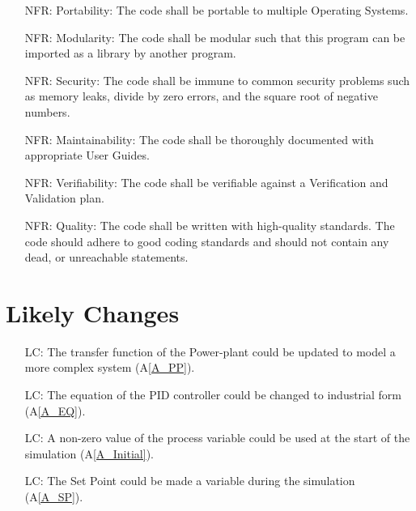 \documentclass[12pt]{article}
\newcommand{\aref}[1]{A\ref{#1}}
\newcounter{reqnum} %
\newcounter{nfreqnum} %
\newcounter{lcnum} %
\begin{document}
\noindent \begin{itemize}

\item[NFR\refstepcounter{nfreqnum}\thenfreqnum \label{R_Portability}:] Portability:
 The code shall be portable to multiple Operating Systems.

\item[NFR\refstepcounter{nfreqnum}\thenfreqnum \label{R_Modularity}:] Modularity:
The code shall be modular such that this program can be imported as a library
by another program. 

\item[NFR\refstepcounter{nfreqnum}\thenfreqnum \label{R_Security}:] Security:
The code shall be immune to common security problems such as memory leaks,
divide by zero errors, and the square root of negative numbers.

\item[NFR\refstepcounter{nfreqnum}\thenfreqnum \label{R_Maintainability}:] Maintainability:
The code shall be thoroughly documented with appropriate User Guides.

\item[NFR\refstepcounter{nfreqnum}\thenfreqnum \label{R_Verifiable}:] Verifiability: 
The code shall be verifiable against a Verification and Validation plan.

\item[NFR\refstepcounter{nfreqnum}\thenfreqnum \label{R_Quality}:] Quality: The code
shall be written with high-quality standards. The code should adhere to good coding 
standards and should not contain any dead, or unreachable statements.


\end{itemize}

\section{Likely Changes}    

\noindent \begin{itemize}

\item[LC\refstepcounter{lcnum}\thelcnum\label{LC_PP}:]  The transfer function of the Power-plant could be updated 
    to model a more complex system (\aref{A_PP}).
    
\item[LC\refstepcounter{lcnum}\thelcnum\label{LC_EQ}:] The equation of the 
    PID controller could be changed to industrial form (\aref{A_EQ}).
    
\item[LC\refstepcounter{lcnum}\thelcnum\label{LC_Initial}:] A non-zero value
    of the process variable could be used at the start of the simulation 
    (\aref{A_Initial}).
    
\item[LC\refstepcounter{lcnum}\thelcnum\label{LC_SP}:] The Set Point could be 
    made a variable during the simulation (\aref{A_SP}).

\end{itemize}
\end{document}
